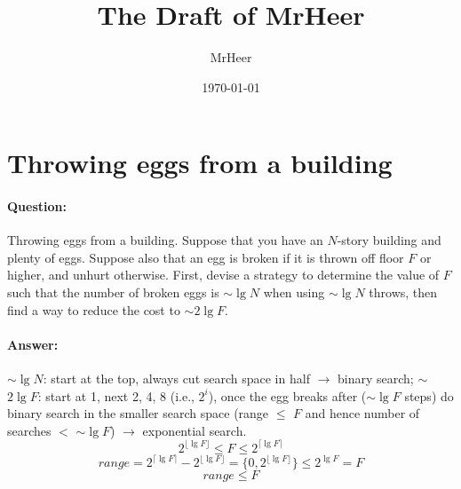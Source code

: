 \documentclass[12pt]{article}
\title{The Draft of MrHeer}
\author{MrHeer}
\date{\today}
\numberwithin{equation}{section}
\begin{document}
\begin{titlepage}
    \maketitle
    \thispagestyle{empty}
\end{titlepage}

\begin{center}
    \tableofcontents
\end{center}

\newpage
{}
\setcounter{page}{1}

\section{Throwing eggs from a building}
\paragraph{Question:}
Throwing eggs from a building. Suppose that you have an $N$-story building and
plenty of eggs. Suppose also that an egg is broken if it is thrown off floor $F$ or higher,
and unhurt otherwise. First, devise a strategy to determine the value of $F$ such that the
number of broken eggs is $\sim$$\lg{N}$ when using $\sim$$\lg{N}$ throws, then find a way to reduce the
cost to $\sim$$2\lg{F}$.
\paragraph{Answer:}
$\sim$$\lg{N}$: start at the top, always cut search space in half $\rightarrow$ binary search;
$\sim$$2\lg{F}$: start at 1, next 2, 4, 8 (i.e., $2^i$), once the egg breaks after ($\sim$$\lg{F}$ steps)
do binary search in the smaller search space (range $\leqslant$ $F$ and hence number of searches $<$ $\sim$$\lg{F}$)
$\rightarrow$ exponential search.
\[2^{\lfloor \lg{F} \rfloor} \leqslant F \leqslant 2^{\lceil \lg{F} \rceil}\]
\[range = 2^{\lceil \lg{F} \rceil} - 2^{\lfloor \lg{F} \rfloor}
= \{0, 2^{\lfloor \lg{F} \rfloor}\} \leqslant 2^{\lg{F}} = F\]
\[range \leqslant F\]
\end{document}
